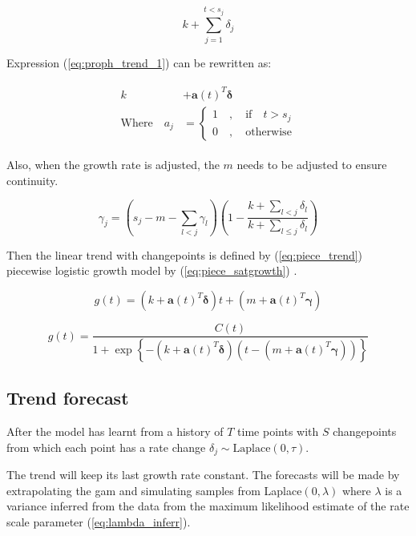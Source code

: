 \begin{equation}
	\label{eq:proph_trend_1}
	k + \sum_{j=1}^{t < s_j}{\delta_j}
\end{equation}

Expression (\ref{eq:proph_trend_1}) can be rewritten as:

\begin{align}
	\begin{split}
		k &+ \bm{a}(t)^T\bm{\delta} \\
		\text{Where}\quad a_j &= 
		\begin{cases*}
			1\quad,\quad\text{if} \quad t > s_j \\
			0\quad,\quad\text{otherwise}
		\end{cases*}
	\end{split}
\end{align}

Also, when the growth rate is adjusted, the $m$ needs to be adjusted to ensure continuity. 

\begin{equation}
	\gamma_j = \left( s_j - m - \sum_{l<j}{\gamma_l} \right) \left(1 - \frac{k+\sum_{l<j}{\delta_l}}{k+\sum_{l \leq j}{\delta_l}} \right)
\end{equation}

Then the linear trend with changepoints is defined by (\ref{eq:piece_trend}) piecewise logistic growth model by (\ref{eq:piece_satgrowth}) \cite{fb_prophet}.

\begin{equation}\label{eq:piece_trend}
	g(t) = \left( k + \bm{a}(t)^T \bm{\delta} \right)t + \left( m + \bm{a}(t)^T \bm{\gamma} \right)
\end{equation}

\begin{equation}\label{eq:piece_satgrowth}
	g(t) = \frac{C(t)}
	{1 + \exp\left\{-(k+\bm{a}(t)^T\bm{\delta})(t-(m+\bm{a}(t)^T \bm{\gamma}))\right\}
	}
\end{equation}


\subsection{Trend forecast}


After the model has learnt from a history of $T$ time points with $S$ changepoints from which each point has a rate change $\delta_j \sim \text{Laplace}(0,\tau)$. 

The trend will keep its last growth rate constant. The forecasts will be made by extrapolating the \ac{gam} and simulating samples from Laplace$(0,\lambda)$ where $\lambda$ is a variance inferred from the data from the maximum likelihood estimate of the rate scale parameter (\ref{eq:lambda_inferr}).

